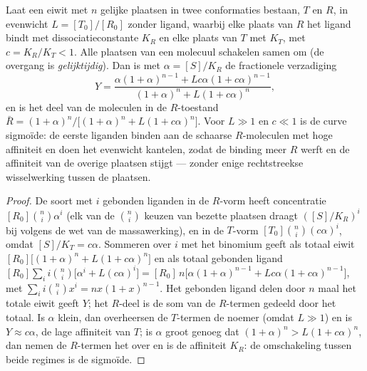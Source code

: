 \begin{theorem}\label{thm:b3:structural-biology:mwc}
Laat een eiwit met $n$ gelijke plaatsen in twee conformaties bestaan,
$T$ en $R$, in evenwicht $L = [T_{0}]/[R_{0}]$ zonder ligand, waarbij
elke plaats van $R$ het ligand bindt met dissociatieconstante $K_{R}$
en elke plaats van $T$ met $K_{T}$, met $c = K_{R}/K_{T} < 1$. Alle
plaatsen van een molecuul schakelen samen om (de overgang is
\emph{gelijktijdig}). Dan is met $\alpha = [S]/K_{R}$ de fractionele
verzadiging
\[
Y = \frac{\alpha(1+\alpha)^{n-1} + Lc\alpha(1+c\alpha)^{n-1}}
{(1+\alpha)^{n} + L(1+c\alpha)^{n}},
\]
en is het deel van de moleculen in de $R$-toestand $\bar R =
(1+\alpha)^{n}/\bigl[(1+\alpha)^{n} + L(1+c\alpha)^{n}\bigr]$. Voor $L
\gg 1$ en $c \ll 1$ is de curve sigmoïde: de eerste liganden binden aan
de schaarse $R$-moleculen met hoge affiniteit en doen het evenwicht
kantelen, zodat de binding meer $R$ werft en de affiniteit van de
overige plaatsen stijgt ---  zonder enige rechtstreekse
wisselwerking tussen de plaatsen.
\end{theorem}
\begin{proof}
De soort met $i$ gebonden liganden in de $R$-vorm heeft concentratie
$[R_{0}]\binom{n}{i}\alpha^{i}$ (elk van de $\binom{n}{i}$ keuzen van
bezette plaatsen draagt $([S]/K_{R})^{i}$ bij volgens de wet van de
massawerking), en in de $T$-vorm $[T_{0}]\binom{n}{i}(c\alpha)^{i}$,
omdat $[S]/K_{T} = c\alpha$. Sommeren over $i$ met het binomium geeft
als totaal eiwit $[R_{0}]\bigl[(1+\alpha)^{n} + L(1+c\alpha)^{n}\bigr]$
en als totaal gebonden ligand $[R_{0}]\sum_{i} i\binom{n}{i}\bigl[
\alpha^{i} + L(c\alpha)^{i}\bigr] = [R_{0}]\,n\bigl[\alpha(1+\alpha)^{n-1}
+ Lc\alpha(1+c\alpha)^{n-1}\bigr]$, met $\sum_{i} i\binom{n}{i}x^{i} =
nx(1+x)^{n-1}$. Het gebonden ligand delen door $n$ maal het totale
eiwit geeft $Y$; het $R$-deel is de som van de $R$-termen gedeeld door
het totaal. Is $\alpha$ klein, dan overheersen de $T$-termen de noemer
(omdat $L \gg 1$) en is $Y \approx c\alpha$, de lage affiniteit van
$T$; is $\alpha$ groot genoeg dat
$(1+\alpha)^{n} > L(1+c\alpha)^{n}$, dan nemen de $R$-termen het over
en is de affiniteit $K_{R}$: de omschakeling tussen beide regimes is de
sigmoïde.
\end{proof}

